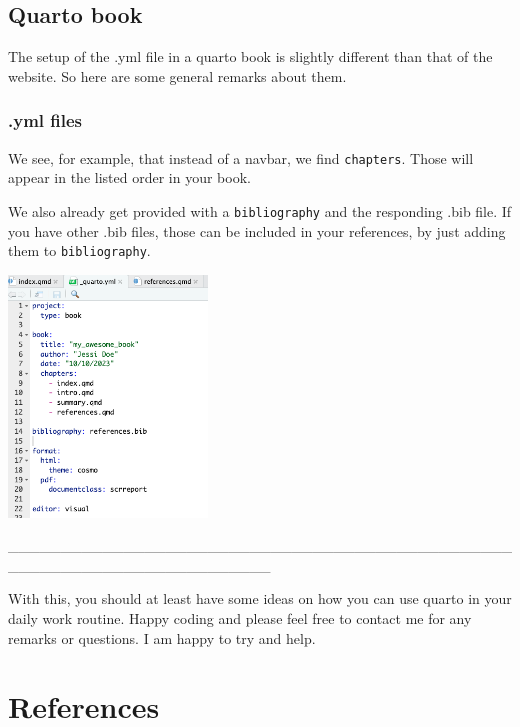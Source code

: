 \documentclass[
  letterpaper,
  DIV=11,
  numbers=noendperiod]{scrreprt}
\newlength{\cslhangindent}
\newlength{\cslentryspacingunit} %
\newenvironment{CSLReferences}[2] %
 {%
  \setlength{\parindent}{0pt}
  \ifodd #1
  \let\oldpar\par
  \def\par{\hangindent=\cslhangindent\oldpar}
  \fi
  \setlength{\parskip}{#2\cslentryspacingunit}
 }%
 {}
\begin{document}
\hypertarget{quarto-book}{%
\section{Quarto book}\label{quarto-book}}

The setup of the .yml file in a quarto book is slightly different than
that of the website. So here are some general remarks about them.

\hypertarget{yml-files-1}{%
\subsection{.yml files}\label{yml-files-1}}

We see, for example, that instead of a navbar, we find
\texttt{chapters}. Those will appear in the listed order in your book.

We also already get provided with a \texttt{bibliography} and the
responding .bib file. If you have other .bib files, those can be
included in your references, by just adding them to
\texttt{bibliography}.

\includegraphics[width=2.08333in,height=\textheight]{img/quarto_intro/Screenshot 2023-10-12 at 11.41.30.png}

\_\_\_\_\_\_\_\_\_\_\_\_\_\_\_\_\_\_\_\_\_\_\_\_\_\_\_\_\_\_\_\_\_\_\_\_\_\_\_\_\_\_\_\_\_\_\_\_\_\_\_\_\_\_\_\_\_\_\_\_\_\_\_\_\_\_\_\_\_\_\_\_\_

With this, you should at least have some ideas on how you can use quarto
in your daily work routine. Happy coding and please feel free to contact
me for any remarks or questions. I am happy to try and help.


\hypertarget{references-1}{%
\chapter*{References}\label{references-1}}


\hypertarget{refs}{}
\begin{CSLReferences}{0}{0}
\end{CSLReferences}
\end{document}
